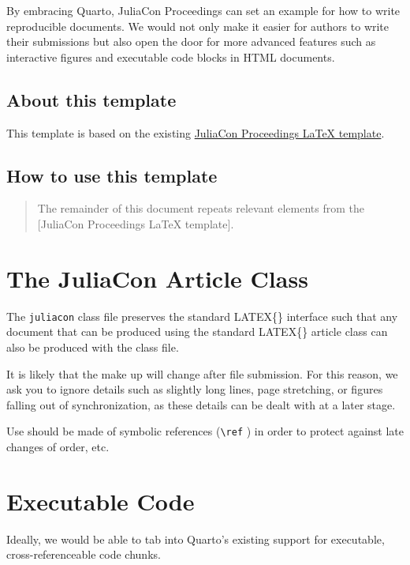 \documentclass{juliacon}
\begin{document}
By embracing Quarto, JuliaCon Proceedings can set an example for how to
write reproducible documents. We would not only make it easier for
authors to write their submissions but also open the door for more
advanced features such as interactive figures and executable code blocks
in HTML documents.

\subsection{About this template}\label{about-this-template}

This template is based on the existing
\href{https://github.com/JuliaCon/JuliaConSubmission.jl}{JuliaCon
Proceedings LaTeX template}.

\subsection{How to use this template}\label{how-to-use-this-template}

\begin{quote}
The remainder of this document repeats relevant elements from the
{[}JuliaCon Proceedings LaTeX template{]}.
\end{quote}

\section{The JuliaCon Article Class}\label{sec-documentclass}

The \texttt{juliacon} class file preserves the standard LATEX\{\}
interface such that any document that can be produced using the standard
LATEX\{\} article class can also be produced with the class file.

It is likely that the make up will change after file submission. For
this reason, we ask you to ignore details such as slightly long lines,
page stretching, or figures falling out of synchronization, as these
details can be dealt with at a later stage.

Use should be made of symbolic references (\verb|\ref| ) in order to
protect against late changes of order, etc.

\section{Executable Code}\label{executable-code}

Ideally, we would be able to tab into Quarto's existing support for
executable, cross-referenceable code chunks.
\end{document}
